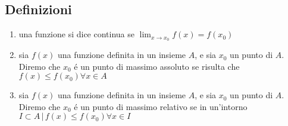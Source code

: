 \documentclass{exam}
\begin{document}
  \subsection{Definizioni}
    \begin{enumerate}
      \item
        una funzione si dice continua se \(\displaystyle \lim_{x\to x_{0}}f(x)=f(x_{0})\)
      \item
        sia $f(x)$ una funzione definita in un insieme $A$, e sia $x_{0}$ un punto di $A$. Diremo che $x_{0}$ \'e un punto di massimo assoluto se risulta che $f(x)\le f(x_{0}) \forall x\in A$
      \item
        sia $f(x)$ una funzione definita in un insieme $A$, e sia $x_{0}$ un punto di $A$. Diremo che $x_{0}$ \'e un punto di massimo relativo se in un'intorno $I\subset A\,|\,f(x)\le f(x_{0}) \forall x\in I$
    \end{enumerate}
\end{document}
